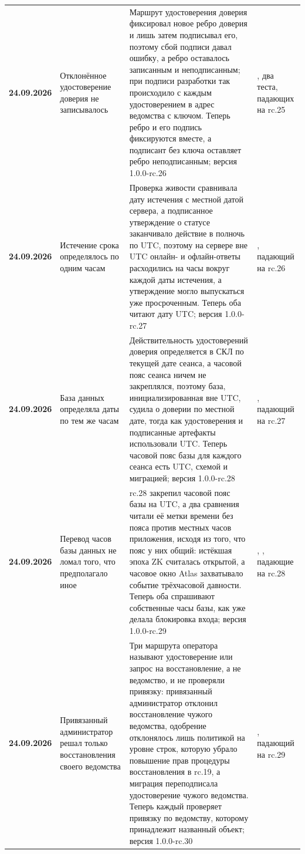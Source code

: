 {\begin{xltabular}{\textwidth}{>{\bfseries\hspace{0pt}}p{0.74in} >{\RaggedRight\arraybackslash\hspace{0pt}}X >{\RaggedRight\arraybackslash\hspace{0pt}}X >{\RaggedRight\arraybackslash\hspace{0pt}}p{1.6in}}
24.09.2026 & Отклонённое удостоверение доверия не записывалось & Маршрут удостоверения доверия фиксировал новое ребро доверия и лишь затем подписывал его, поэтому сбой подписи давал ошибку, а ребро оставалось записанным и неподписанным; при подписи разработки так происходило с каждым удостоверением в адрес ведомства с ключом. Теперь ребро и его подпись фиксируются вместе, а подписант без ключа оставляет ребро неподписанным; версия 1.0.0-rc.26 & , два теста, падающих на rc.25 \\
24.09.2026 & Истечение срока определялось по одним часам & Проверка живости сравнивала дату истечения с местной датой сервера, а подписанное утверждение о статусе заканчивало действие в полночь по UTC, поэтому на сервере вне UTC онлайн- и офлайн-ответы расходились на часы вокруг каждой даты истечения, а утверждение могло выпускаться уже просроченным. Теперь оба читают дату UTC; версия 1.0.0-rc.27 & , падающий на rc.26 \\
24.09.2026 & База данных определяла даты по тем же часам & Действительность удостоверений доверия определяется в СКЛ по текущей дате сеанса, а часовой пояс сеанса ничем не закреплялся, поэтому база, инициализированная вне UTC, судила о доверии по местной дате, тогда как удостоверения и подписанные артефакты использовали UTC. Теперь часовой пояс базы для каждого сеанса есть UTC, схемой и миграцией; версия 1.0.0-rc.28 & , падающий на rc.27 \\
24.09.2026 & Перевод часов базы данных не ломал того, что предполагало иное & rc.28 закрепил часовой пояс базы на UTC, а два сравнения читали её метки времени без пояса против местных часов приложения, исходя из того, что пояс у них общий: истёкшая эпоха ZK считалась открытой, а часовое окно Atlas захватывало событие трёхчасовой давности. Теперь оба спрашивают собственные часы базы, как уже делала блокировка входа; версия 1.0.0-rc.29 & , , падающие на rc.28 \\
24.09.2026 & Привязанный администратор решал только восстановления своего ведомства & Три маршрута оператора называют удостоверение или запрос на восстановление, а не ведомство, и не проверяли привязку: привязанный администратор отклонил восстановление чужого ведомства, одобрение отклонялось лишь политикой на уровне строк, которую убрало повышение прав процедуры восстановления в rc.19, а миграция переподписала удостоверение чужого ведомства. Теперь каждый проверяет привязку по ведомству, которому принадлежит названный объект; версия 1.0.0-rc.30 & , падающий на rc.29 \\

\end{xltabular}}
